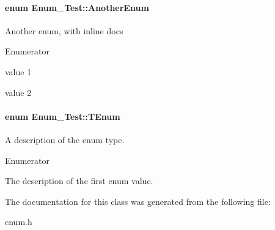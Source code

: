 \paragraph[{\texorpdfstring{Another\+Enum}{AnotherEnum}}]{\setlength{\rightskip}{0pt plus 5cm}enum {\bf Enum\+\_\+\+Test\+::\+Another\+Enum}}\hypertarget{class_enum___test_a633286511e19b996e97699d7dd2cd2a0}{}\label{class_enum___test_a633286511e19b996e97699d7dd2cd2a0}
Another enum, with inline docs \begin{Desc}
\item[Enumerator]\par
\begin{description}
\item[{\em 
V1\hypertarget{class_enum___test_a633286511e19b996e97699d7dd2cd2a0ab0e5fe049a18d196b564c00bb241722f}{}\label{class_enum___test_a633286511e19b996e97699d7dd2cd2a0ab0e5fe049a18d196b564c00bb241722f}
}]value 1 \item[{\em 
V2\hypertarget{class_enum___test_a633286511e19b996e97699d7dd2cd2a0ae83b4255ceeedf0c49dd65d1eff8b750}{}\label{class_enum___test_a633286511e19b996e97699d7dd2cd2a0ae83b4255ceeedf0c49dd65d1eff8b750}
}]value 2 \end{description}
\end{Desc}
\paragraph[{\texorpdfstring{T\+Enum}{TEnum}}]{\setlength{\rightskip}{0pt plus 5cm}enum {\bf Enum\+\_\+\+Test\+::\+T\+Enum}}\hypertarget{class_enum___test_a8d096bc026dbb395991f02e3ca86eb1c}{}\label{class_enum___test_a8d096bc026dbb395991f02e3ca86eb1c}
A description of the enum type. \begin{Desc}
\item[Enumerator]\par
\begin{description}
\item[{\em 
Val1\hypertarget{class_enum___test_a8d096bc026dbb395991f02e3ca86eb1ca88efe763d7807db8a48f6e685277d7fd}{}\label{class_enum___test_a8d096bc026dbb395991f02e3ca86eb1ca88efe763d7807db8a48f6e685277d7fd}
}]The description of the first enum value. \end{description}
\end{Desc}


The documentation for this class was generated from the following file\+:\begin{DoxyCompactItemize}
\item 
enum.\+h\end{DoxyCompactItemize}
